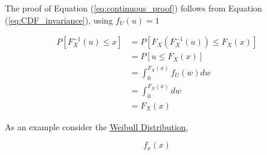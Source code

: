 \documentclass[12pt]{article}
\begin{document}
The proof of Equation (\ref{eq:continuous_proof}) follows from Equation (\ref{eq:CDF_invariance}), using $f_U(u) = 1$

$$
\begin{aligned}
P[F_X^{-1}(u) \leq x] & = P[F_X(F_X^{-1}(u)) \leq F_X(x)] \\
& = P[u \leq F_X(x)] \\
& = \int_{0}^{F_X(x)} f_U(w) dw \\
& = \int_{0}^{F_X(x)} dw \\
& = F_X(x)
\end{aligned}
$$

As an example consider the \href{https://en.wikipedia.org/wiki/Weibull_distribution}{Weibull Distribution},

\begin{equation}
\label{eq:Weibull_distribution}
f_x(x)
\end{equation}
\end{document}
